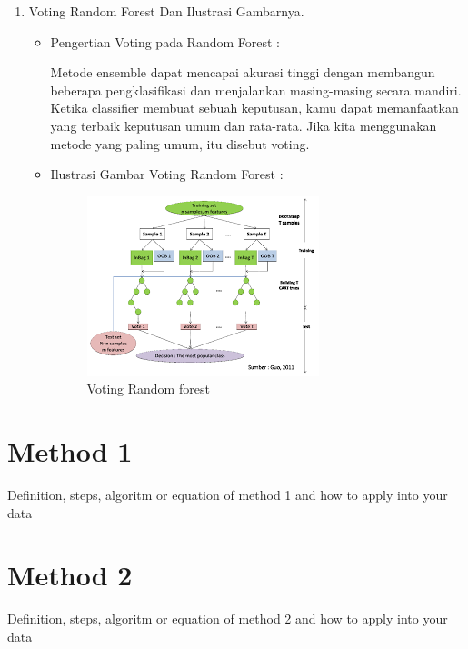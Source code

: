 \begin{enumerate}
\par
\par
\item Voting Random Forest Dan Ilustrasi Gambarnya.
\par
\begin{itemize}
\item Pengertian Voting pada Random Forest	:
\par Metode ensemble dapat mencapai akurasi tinggi dengan membangun beberapa pengklasifikasi dan menjalankan
masing-masing secara mandiri. Ketika classifier membuat sebuah keputusan, kamu dapat memanfaatkan yang terbaik
keputusan umum dan rata-rata. Jika kita menggunakan metode yang paling umum, itu disebut voting.
\item Ilustrasi Gambar Voting Random Forest :
\begin{figure}[ht]
\centering
\includegraphics[scale=0.8]{figures/aku2.png}
\caption{Voting Random forest}
\label{contoh}
\end{figure}
\end{itemize}
\end{enumerate}





\section{Method 1}
Definition, steps, algoritm or equation of method 1 and how to apply into your data
\section{Method 2}
Definition, steps, algoritm or equation of method 2 and how to apply into your data